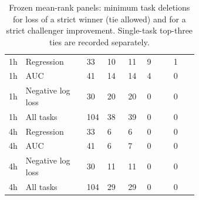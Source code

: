 \begin{table}[htbp]
\centering\small{}
\caption{Frozen mean-rank panels: minimum task deletions for loss of a strict winner (tie allowed) and for a strict challenger improvement. Single-task top-three ties are recorded separately.}
\begin{tabularx}{\linewidth}{@{}L{0.08\linewidth}XN{0.08\linewidth}N{0.11\linewidth}N{0.10\linewidth}N{0.14\linewidth}N{0.13\linewidth}@{}}
\toprule
{} &  &  &  &  &  & \\\midrule
1h & Regression & 33 & 10 & 11 & 9 & 1\\
1h & AUC & 41 & 14 & 14 & 4 & 0\\
1h & Negative log loss & 30 & 20 & 20 & 0 & 0\\
1h & All tasks & 104 & 38 & 39 & 0 & 0\\
4h & Regression & 33 & 6 & 6 & 0 & 0\\
4h & AUC & 41 & 6 & 7 & 0 & 0\\
4h & Negative log loss & 30 & 11 & 11 & 0 & 0\\
4h & All tasks & 104 & 29 & 29 & 0 & 0\\
\bottomrule
\end{tabularx}
\end{table}
